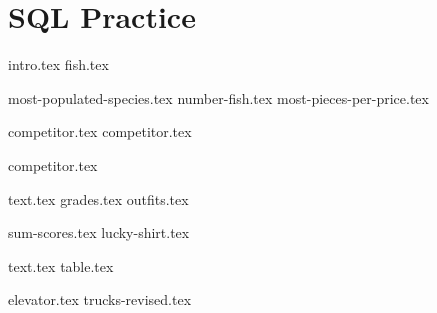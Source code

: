\documentclass{exam}
\begin{document}
\section{SQL Practice}
{intro.tex}
{fish.tex}
\begin{questions}
  {most-populated-species.tex}
  {number-fish.tex}
  {most-pieces-per-price.tex}
\end{questions}

\newpage
{competitor.tex}
{competitor.tex}
\begin{questions}
{competitor.tex}
\end{questions}

\newpage
{text.tex}
{grades.tex}
{outfits.tex}

\begin{questions}
{sum-scores.tex}
{lucky-shirt.tex}
\end{questions}

\newpage
{text.tex}
{table.tex}
\begin{questions}
{elevator.tex}
{trucks-revised.tex}
\end{questions}


\end{document}

